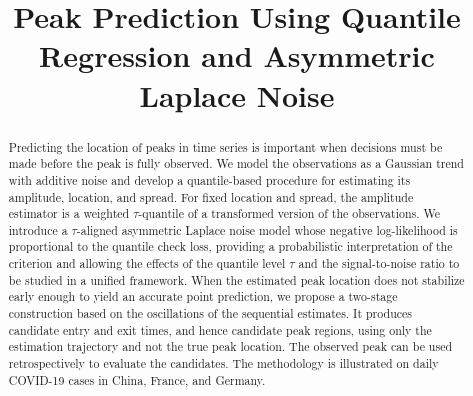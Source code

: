 \documentclass[12pt,a4paper]{article}
\title{\textbf{Peak Prediction Using Quantile Regression and Asymmetric Laplace Noise}}
\author{}
\date{}
\begin{document}
\maketitle
\begin{abstract}
	\noindent
	Predicting the location of peaks in time series is important when
	decisions must be made before the peak is fully observed. We model the
	observations as a Gaussian trend with additive noise and develop a
	quantile-based procedure for estimating its amplitude, location, and
	spread. For fixed location and spread, the amplitude estimator is a
	weighted $\tau$-quantile of a transformed version of the observations.
	We introduce a $\tau$-aligned asymmetric Laplace noise model whose
	negative log-likelihood is proportional to the quantile check loss,
	providing a probabilistic interpretation of the criterion and allowing
	the effects of the quantile level $\tau$ and the signal-to-noise ratio
	to be studied in a unified framework. When the estimated peak location
	does not stabilize early enough to yield an accurate point prediction,
	we propose a two-stage construction based on the oscillations of the
	sequential estimates. It produces candidate entry and exit times, and
	hence candidate peak regions, using only the estimation trajectory and
	not the true peak location. The observed peak can be used
	retrospectively to evaluate the candidates. The methodology is
	illustrated on daily COVID-19 cases in China, France, and Germany.
\end{abstract}

\end{document}
